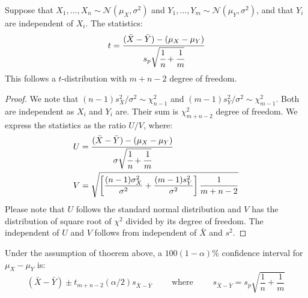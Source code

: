 \begin{theorem}
    Suppose that $X_1,\dots,X_n \sim \mathcal{N}(\mu_X, \sigma^2)$ and $Y_1,\dots,Y_m \sim \mathcal{N}(\mu_Y, \sigma^2)$, and that $Y_i$ are independent of $X_i$. The statistics:
    \begin{equation*}
        t = \cfrac{(\bar{X} - \bar{Y}) - (\mu_X - \mu_Y)}{s_p\sqrt{\cfrac{1}{n} + \cfrac{1}{m}}}
    \end{equation*}
    This follows a $t$-distribution with $m+n-2$ degree of freedom. 
\end{theorem}
\begin{proof}
    We note that $(n-1)s_X^2/\sigma^2 \sim \chi^2_{n-1}$ and $(m-1)s_Y^2/\sigma^2\sim \chi^2_{m-1}$. Both are independent as $X_i$ and $Y_i$ are. Their sum is $\chi^2_{m+n-2}$ degree of freedom. We express the statistics as the ratio $U/V$, where:
    \begin{equation*}
    \begin{aligned}
        &U = \cfrac{(\bar{X} - \bar{Y}) - (\mu_X - \mu_Y)}{\sigma\sqrt{\cfrac{1}{n} + \cfrac{1}{m}}} \\
        &V = \sqrt{\left[ \frac{(n-1)\sigma^2_X}{\sigma^2} + \frac{(m-1)s_Y^2}{\sigma^2} \right]\frac{1}{m+n-2} }
    \end{aligned}
    \end{equation*}
    Please note that $U$ follows the standard normal distribution and $V$ has the distribution of square root of $\chi^2$ divided by its degree of freedom.  The independent of $U$ and $V$ follows from independent of $\bar{X}$ and $s^2$. 
\end{proof}

\begin{corollary}
    Under the assumption of thoerem above, a $100(1-\alpha)\%$ confidence interval for $\mu_X - \mu_Y$ is:
    \begin{equation*}
        (\bar{X} - \bar{Y}) \pm t_{m+n-2}(\alpha/2)s_{\bar{X} - \bar{Y}} \qquad \text{ where } \qquad s_{\bar{X} - \bar{Y}} = s_p\sqrt{\frac{1}{n} + \frac{1}{m}}
    \end{equation*}
\end{corollary}

